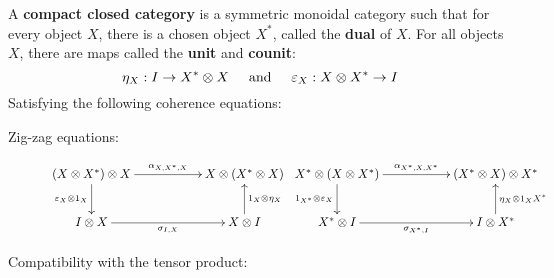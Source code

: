 \begin{definition}
A {\bf compact closed category} is a symmetric monoidal category such that for every object $X$, there is a chosen object $X^*$, called the {\bf dual} of $X$.
For all objects $X$, there are maps called the {\bf unit} and {\bf counit}:
$$
\eta_X:I\to X^* \otimes X\hspace*{.5cm}\text{and}\hspace*{.5cm} \epsilon_X:X\otimes X^*\to I 
$$
Satisfying the following coherence equations:
\begin{description}
\item[Zig-zag equations:]
$$
\xymatrix{
  (X\otimes X^*)\otimes X \ar[rr]^{\alpha_{X,X^*,X}}  \ar[d]_{\epsilon_X\otimes 1_X}
    & 
    & X\otimes(X^*\otimes X)
  \\I\otimes X \ar[rr]_{\sigma_{I,X}}
    &
    & X\otimes I \ar[u]_{1_X\otimes \eta_X}
}
\hspace*{.1cm}
\xymatrix{
  X^*\otimes ( X\otimes X^*) \ar[rr]^{\alpha_{X^*,X,X^*}}  \ar[d]_{1_{X^*}\otimes \epsilon_X}
    & 
    & (X^* \otimes X)\otimes X^*
  \\X^*\otimes I \ar[rr]_{\sigma_{X^*,I}}
    &
    & I\otimes X^* \ar[u]_{\eta_X\otimes 1_X{X^*}}
}
$$
\item[Compatibility with the tensor product:]\


\end{description}
\end{definition}
